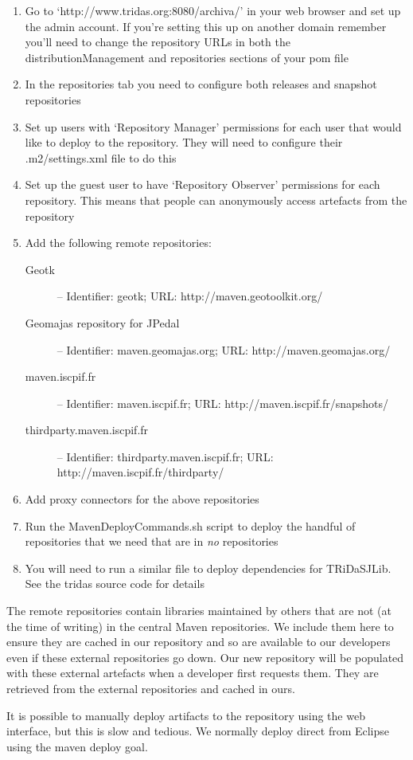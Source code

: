 \begin{enumerate}
 \item Go to `http://www.tridas.org:8080/archiva/' in your web browser and set up the admin account.  If you're setting this up on another domain remember you'll need to change the repository URLs in both the distributionManagement and repositories sections of your pom file
 \item In the repositories tab you need to configure both releases and snapshot repositories
 \item Set up users with `Repository Manager' permissions for each user that would like to deploy to the repository.  They will need to configure their .m2/settings.xml file to do this
 \item Set up the guest user to have `Repository Observer' permissions for each repository.  This means that people can anonymously access artefacts from the repository
 \item Add the following remote repositories:
      \begin{description}
       \item[Geotk] -- Identifier: geotk; URL: http://maven.geotoolkit.org/
       \item[Geomajas repository for JPedal] -- Identifier: maven.geomajas.org; URL: http://maven.geomajas.org/
       \item[maven.iscpif.fr] -- Identifier: maven.iscpif.fr; URL: http://maven.iscpif.fr/snapshots/
       \item[thirdparty.maven.iscpif.fr] -- Identifier: thirdparty.maven.iscpif.fr; URL: http://maven.iscpif.fr/thirdparty/
      \end{description}
 \item Add proxy connectors for the above repositories
 \item Run the MavenDeployCommands.sh script to deploy the handful of repositories that we need that are in \emph{no} repositories 
 \item You will need to run a similar file to deploy dependencies for TRiDaSJLib.  See the tridas source code for details
\end{enumerate}

The remote repositories contain libraries maintained by others that are not (at the time of writing) in the central Maven repositories.  We include them here to ensure they are cached in our repository and so are available to our developers even if these external repositories go down.  Our new repository will be populated with these external artefacts when a developer first requests them.  They are retrieved from the external repositories and cached in ours.

It is possible to manually deploy artifacts to the repository using the web interface, but this is slow and tedious.  We normally deploy direct from Eclipse using the maven deploy goal.  






